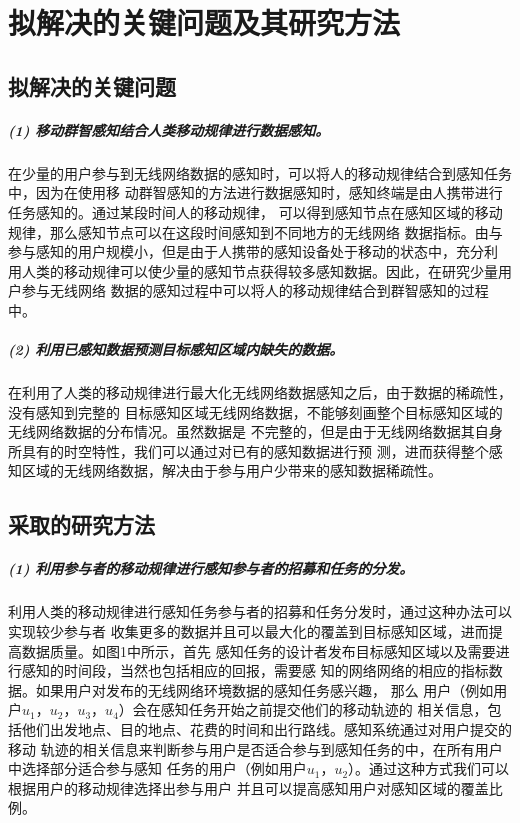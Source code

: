 \documentclass[UTF8]{ctexart}
\begin{document}
\section{拟解决的关键问题及其研究方法}
\subsection{拟解决的关键问题}
\subparagraph{(1) 移动群智感知结合人类移动规律进行数据感知。}

在少量的用户参与到无线网络数据的感知时，可以将人的移动规律结合到感知任务中，因为在使用移
动群智感知的方法进行数据感知时，感知终端是由人携带进行任务感知的。通过某段时间人的移动规律，
可以得到感知节点在感知区域的移动规律，那么感知节点可以在这段时间感知到不同地方的无线网络
数据指标。由与参与感知的用户规模小，但是由于人携带的感知设备处于移动的状态中，充分利
用人类的移动规律可以使少量的感知节点获得较多感知数据。因此，在研究少量用户参与无线网络
数据的感知过程中可以将人的移动规律结合到群智感知的过程中。

\subparagraph{(2) 利用已感知数据预测目标感知区域内缺失的数据。}

在利用了人类的移动规律进行最大化无线网络数据感知之后，由于数据的稀疏性，没有感知到完整的
目标感知区域无线网络数据，不能够刻画整个目标感知区域的无线网络数据的分布情况。虽然数据是
不完整的，但是由于无线网络数据其自身所具有的时空特性，我们可以通过对已有的感知数据进行预
测，进而获得整个感知区域的无线网络数据，解决由于参与用户少带来的感知数据稀疏性。

\subsection{采取的研究方法}
\subparagraph{(1) 利用参与者的移动规律进行感知参与者的招募和任务的分发。}

利用人类的移动规律进行感知任务参与者的招募和任务分发时，通过这种办法可以实现较少参与者
收集更多的数据并且可以最大化的覆盖到目标感知区域，进而提高数据质量。如图1中所示，首先
感知任务的设计者发布目标感知区域以及需要进行感知的时间段，当然也包括相应的回报，需要感
知的网络网络的相应的指标数据。如果用户对发布的无线网络环境数据的感知任务感兴趣， 那么
用户（例如用户$u_1$，$u_2$，$u_3$，$u_4$）会在感知任务开始之前提交他们的移动轨迹的
相关信息，包括他们出发地点、目的地点、花费的时间和出行路线。感知系统通过对用户提交的移动
轨迹的相关信息来判断参与用户是否适合参与到感知任务的中，在所有用户中选择部分适合参与感知
任务的用户（例如用户$u_1$，$u_2$）。通过这种方式我们可以根据用户的移动规律选择出参与用户
并且可以提高感知用户对感知区域的覆盖比例。
\end{document}
